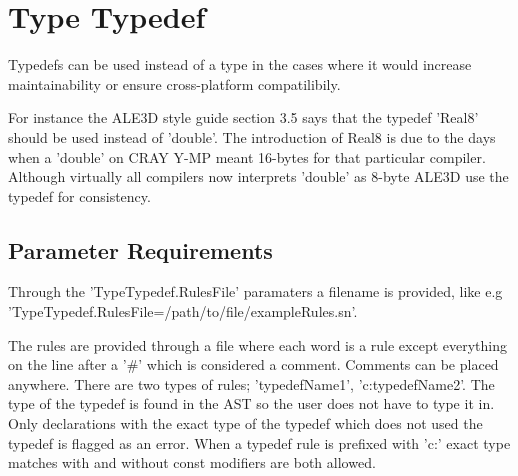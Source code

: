%
%

\section{Type Typedef}
\label{TypeTypedef::overview}

Typedefs can be used instead of a type in the cases where it would
increase maintainability or ensure cross-platform compatilibily.

For instance the ALE3D style guide section 3.5 says that the typedef
'Real8' should be used instead of 'double'. The introduction of Real8
is due to the days when a 'double' on CRAY Y-MP meant 16-bytes for
that particular compiler. Although virtually all compilers now interprets
'double' as 8-byte ALE3D use the typedef for consistency.


\subsection{Parameter Requirements}
Through the 'TypeTypedef.RulesFile' paramaters a filename is provided,
like e.g 'TypeTypedef.RulesFile=/path/to/file/exampleRules.sn'.

The rules are provided through a file where each word is a rule except
everything on the line after a '\#' which is considered a comment. Comments 
can be placed anywhere. There are two types of rules; 'typedefName1',
'c:typedefName2'. The type of the typedef is found in the AST so the user
does not have to type it in. Only declarations with the exact type of the
typedef which does not used the typedef is flagged as an error. When a 
typedef rule is prefixed with 'c:' exact type
matches with and without const modifiers are both allowed.

